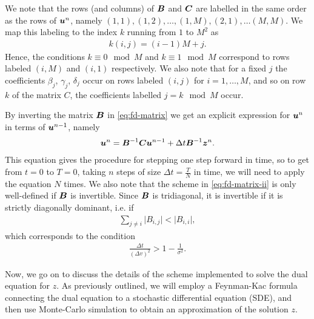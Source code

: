 \documentclass{article}  %
\begin{document}
We note that the rows (and columns) of $\boldsymbol{B}$ and $\boldsymbol{C}$ are labelled in the same order as the rows of $\boldsymbol{u}^n$, namely $(1,1),(1,2),\dots,(1,M),(2,1),\dots(M,M)$. We map this labeling to the index $k$ running from $1$ to $M^2$ as 
%
\begin{align}
    k(i,j) = (i-1)M + j.
\end{align}
%
Hence, the conditions $k\equiv 0 \mod M$ and $k\equiv 1 \mod M$ correspond to rows labeled $(i,M)$ and $(i,1)$ respectively. We also note that for a fixed $j$ the coefficients $\beta_j$, $\gamma_j$, $\delta_j$ occur on rows labeled $(i,j)$ for $i=1,\dots,M$, and so on row $k$ of the matrix $C$, the coefficients labelled $j = k \mod M$ occur.

By inverting the matrix $\boldsymbol{B}$ in \autoref{eq:fd-matrix} we get an explicit expression for $\boldsymbol{u}^n$ in terms of $\boldsymbol{u}^{n-1}$, namely
%
\begin{align} 
    \label{eq:fd-matrix-ii}
    \boldsymbol{u}^n = \boldsymbol{B}^{-1}\boldsymbol{C}\boldsymbol{u}^{n-1} + \Delta t \boldsymbol{B}^{-1}\boldsymbol{z}^n.
\end{align}
%
This equation gives the procedure for stepping one step forward in time, so to get from $t=0$ to $T=0$, taking $n$ steps of size $\Delta t = \frac{T}{N}$ in time, we will need to apply the equation $N$ times. We also note that the scheme in \autoref*{eq:fd-matrix-ii} is only well-defined if $\boldsymbol{B}$ is invertible. Since $\boldsymbol{B}$ is tridiagonal, it is invertible if it is strictly diagonally dominant, i.e. if
%
\begin{align} 
    \sum_{j\neq i} \lvert B_{i,j} \rvert < \lvert B_{i,i} \rvert,  
\end{align}
%
which corresponds to the condition 
%
\begin{align}
    \frac{\Delta t}{(\Delta v)^2} > 1 - \frac{1}{\sigma^2}.
\end{align}
%

Now, we go on to discuss the details of the scheme implemented to solve the dual equation for $z$. As previously outlined, we will employ a Feynman-Kac formula connecting the dual equation to a stochastic differential equation (SDE), and then use Monte-Carlo simulation to obtain an approximation of the solution $z$.
\end{document}
